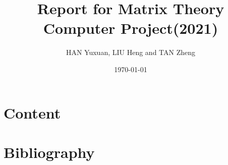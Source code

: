 \documentclass[
]{beamer}
\begin{document}
    \title{Report for Matrix Theory Computer Project(2021)}  %
    \author{HAN Yuxuan, LIU Heng and TAN Zheng}                  %
    \date{\today}                          %
    \maketitle                             %

\part{Content}







\part{Bibliography}
\begin{frame}[allowframebreaks]
    \printbibliography[title=Bibliography]    %
\end{frame}

\makebottom     %
\end{document}
